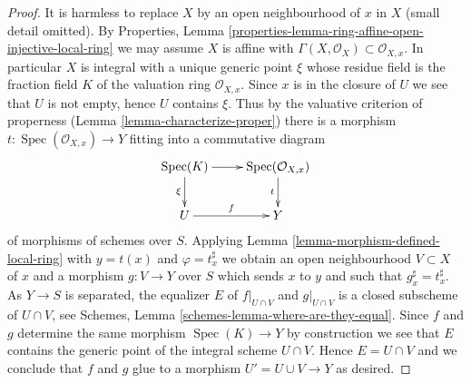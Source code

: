 \documentclass[10pt,a4paper]{amsart}
\theoremstyle{plain}
\theoremstyle{definition}
\theoremstyle{remark}
\numberwithin{equation}{subsection}
\def\Spec{\mathop{\mathrm{Spec}}}
\begin{document}
\begin{proof}
It is harmless to replace $X$ by an open neighbourhood of $x$ in $X$
(small detail omitted). By Properties, Lemma
\ref{properties-lemma-ring-affine-open-injective-local-ring}
we may assume $X$ is affine with
$\Gamma(X, \mathcal{O}_X) \subset \mathcal{O}_{X, x}$.
In particular $X$ is integral with a unique generic point $\xi$
whose residue field is the fraction field $K$ of the
valuation ring $\mathcal{O}_{X, x}$.
Since $x$ is in the closure of $U$ we see that $U$ is not
empty, hence $U$ contains $\xi$. Thus by the valuative criterion
of properness (Lemma \ref{lemma-characterize-proper})
there is a morphism $t : \Spec(\mathcal{O}_{X, x}) \to Y$
fitting into a commutative diagram
$$
\xymatrix{
\Spec(K) \ar[d]_\xi \ar[r] & \Spec(\mathcal{O}_{X, x}) \ar[d]_t \\
U \ar[r]^f & Y
}
$$
of morphisms of schemes over $S$. Applying
Lemma \ref{lemma-morphism-defined-local-ring}
with $y = t(x)$ and $\varphi = t^\sharp_x$ we obtain an open
neighbourhood $V \subset X$ of $x$ and a morphism $g : V \to Y$
over $S$ which sends $x$ to $y$ and such that $g^\sharp_x = t^\sharp_x$.
As $Y \to S$ is separated, the equalizer $E$ of $f|_{U \cap V}$
and $g|_{U \cap V}$ is a closed subscheme of $U \cap V$, see
Schemes, Lemma \ref{schemes-lemma-where-are-they-equal}.
Since $f$ and $g$ determine the same morphism $\Spec(K) \to Y$
by construction we see that $E$ contains the generic point
of the integral scheme $U \cap V$. Hence $E = U \cap V$ and
we conclude that $f$ and $g$ glue to a morphism $U' = U \cup V \to Y$
as desired.
\end{proof}
\end{document}
